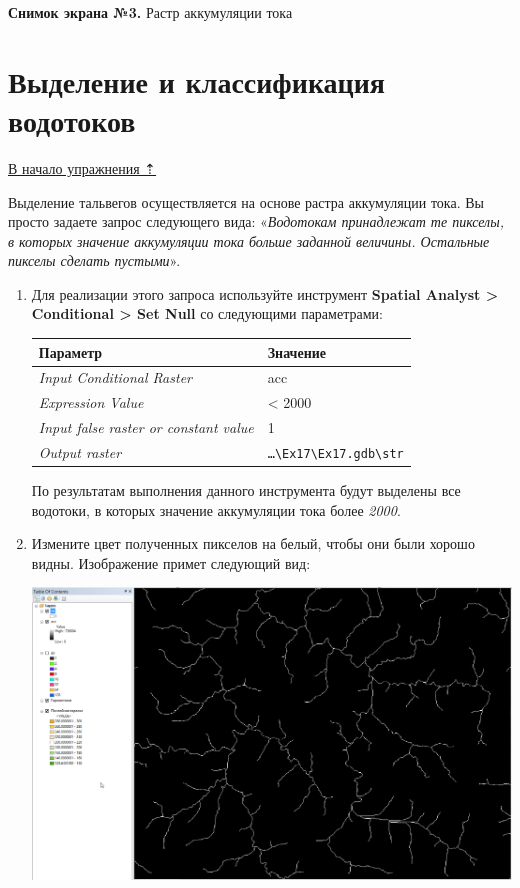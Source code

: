 \documentclass[]{book}
\theoremstyle{definition}
\theoremstyle{definition}
\theoremstyle{definition}
\theoremstyle{remark}
\begin{document}
\textbf{Снимок экрана №3.} Растр аккумуляции тока

\hypertarget{dem-classify}{%
\section{Выделение и классификация водотоков}\label{dem-classify}}

\protect\hyperlink{dem-analysis}{В начало упражнения ⇡}

Выделение тальвегов осуществляется на основе растра аккумуляции тока. Вы
просто задаете запрос следующего вида: «\emph{Водотокам принадлежат те
пикселы, в которых значение аккумуляции тока больше заданной величины.
Остальные пикселы сделать пустыми}».

\begin{enumerate}
\def\labelenumi{\arabic{enumi}.}
\item
  Для реализации этого запроса используйте инструмент \textbf{Spatial
  Analyst \textgreater{} Conditional \textgreater{} Set Null} со
  следующими параметрами:

  \begin{longtable}[]{@{}ll@{}}
  \toprule
  Параметр & Значение\tabularnewline
  \midrule
  \endhead
  \emph{Input Conditional Raster} & acc\tabularnewline
  \emph{Expression Value} & \textless{} 2000\tabularnewline
  \emph{Input false raster or constant value} & 1\tabularnewline
  \emph{Output raster} &
  \texttt{\ldots{}\textbackslash{}Ex17\textbackslash{}Ex17.gdb\textbackslash{}str}\tabularnewline
  \bottomrule
  \end{longtable}

  По результатам выполнения данного инструмента будут выделены все
  водотоки, в которых значение аккумуляции тока более \emph{2000}.
\item
  Измените цвет полученных пикселов на белый, чтобы они были хорошо
  видны. Изображение примет следующий вид:

  \includegraphics{images/Ex17/image14.png}


\end{enumerate}
\end{document}
